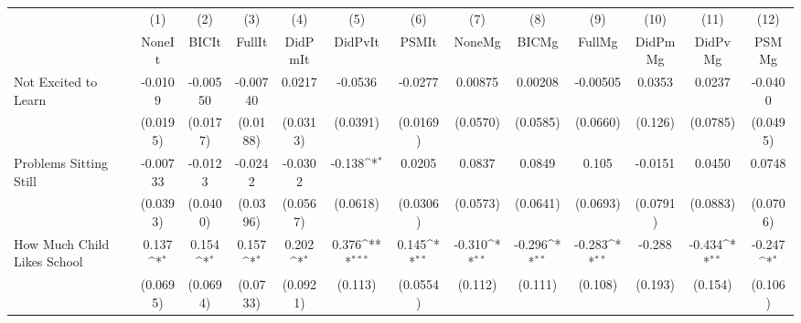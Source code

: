 {
\def\sym#1{\ifmmode^{#1}\else\(^{#1}\)\fi}
\begin{tabular}{l*{12}{c}}
\toprule
            &\multicolumn{1}{c}{(1)}&\multicolumn{1}{c}{(2)}&\multicolumn{1}{c}{(3)}&\multicolumn{1}{c}{(4)}&\multicolumn{1}{c}{(5)}&\multicolumn{1}{c}{(6)}&\multicolumn{1}{c}{(7)}&\multicolumn{1}{c}{(8)}&\multicolumn{1}{c}{(9)}&\multicolumn{1}{c}{(10)}&\multicolumn{1}{c}{(11)}&\multicolumn{1}{c}{(12)}\\
            &\multicolumn{1}{c}{NoneIt}&\multicolumn{1}{c}{BICIt}&\multicolumn{1}{c}{FullIt}&\multicolumn{1}{c}{DidPmIt}&\multicolumn{1}{c}{DidPvIt}&\multicolumn{1}{c}{PSMIt}&\multicolumn{1}{c}{NoneMg}&\multicolumn{1}{c}{BICMg}&\multicolumn{1}{c}{FullMg}&\multicolumn{1}{c}{DidPmMg}&\multicolumn{1}{c}{DidPvMg}&\multicolumn{1}{c}{PSMMg}\\
\midrule
Not Excited to Learn&     -0.0109         &    -0.00550         &    -0.00740         &      0.0217         &     -0.0536         &     -0.0277         &     0.00875         &     0.00208         &    -0.00505         &      0.0353         &      0.0237         &     -0.0400         \\
            &    (0.0195)         &    (0.0177)         &    (0.0188)         &    (0.0313)         &    (0.0391)         &    (0.0169)         &    (0.0570)         &    (0.0585)         &    (0.0660)         &     (0.126)         &    (0.0785)         &    (0.0495)         \\
\addlinespace
Problems Sitting Still&    -0.00733         &     -0.0123         &     -0.0242         &     -0.0302         &      -0.138\sym{*}  &      0.0205         &      0.0837         &      0.0849         &       0.105         &     -0.0151         &      0.0450         &      0.0748         \\
            &    (0.0393)         &    (0.0400)         &    (0.0396)         &    (0.0567)         &    (0.0618)         &    (0.0306)         &    (0.0573)         &    (0.0641)         &    (0.0693)         &    (0.0791)         &    (0.0883)         &    (0.0706)         \\
\addlinespace
How Much Child Likes School&       0.137\sym{*}  &       0.154\sym{*}  &       0.157\sym{*}  &       0.202\sym{*}  &       0.376\sym{***}&       0.145\sym{**} &      -0.310\sym{**} &      -0.296\sym{**} &      -0.283\sym{**} &      -0.288         &      -0.434\sym{**} &      -0.247\sym{*}  \\
            &    (0.0695)         &    (0.0694)         &    (0.0733)         &    (0.0921)         &     (0.113)         &    (0.0554)         &     (0.112)         &     (0.111)         &     (0.108)         &     (0.193)         &     (0.154)         &     (0.106)         \\

\end{tabular}}
